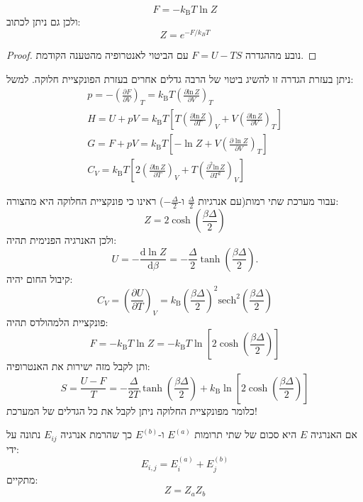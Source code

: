 \documentclass{tstextbook}
\begin{document}
\begin{proposition}
$$F=-k_{\mathrm{B}}T\ln Z$$
ולכן גם ניתן לכתוב:
$$Z=e^{ -F/k_{B}T }$$

\end{proposition}
\begin{proof}
נובע מההגדרה \(F=  U-  T  S\) עם הביטוי לאנטרופיה מהטענה הקודמת.

\end{proof}
\begin{corollary}
ניתן בעזרת הגדרה זו להשיג ביטוי של הרבה גדלים אחרים בעזרת הפונקציית חלוקה. למשל:
$$\begin{gather}p=-\left({\frac{\partial F}{\partial V}}\right)_{T}=k_{\mathrm{B}}T\left({\frac{\partial\mathrm{ln}\,Z}{\partial V}}\right)_{T}  \\H=U+p V=k_{\mathrm{{B}}}T\left[T\left({\frac{\partial\mathrm{ln}\,Z}{\partial T}}\right)_{V}+V\left({\frac{\partial\mathrm{ln}\,Z}{\partial V}}\right)_{T}\right] \\G=F+p V=k_{\mathrm{{B}}}T\left[-\ln Z+V\left({\frac{\partial\ln Z}{\partial V}}\right)_{T}\right] \\C_{V}=k_{\mathrm{{B}}}T\left[2\left(\frac{\partial\mathrm{ln}\,Z}{\partial T}\right)_{V}+T\left(\frac{\partial^{2}\mathrm{ln}\,Z}{\partial T^{2}}\right)_{V}\right]
\end{gather}$$

\end{corollary}
\begin{example}
עבור מערכת שתי רמות(עם אנרגיות \(\frac{\Delta}{2}\) ו-\(-\frac{\Delta}{2}\)) ראינו כי פונקציית החלוקה היא מהצורה:
$$Z=2\cosh\left(\frac{\beta\Delta}{2}\right)$$
ולכן האנרגיה הפנימית תהיה:
$$U=-\frac{\mathrm{d}\ln Z}{\mathrm{d}\beta}=-\frac{\Delta}{2}\operatorname{tanh}\left(\frac{\beta\Delta}{2}\right).$$
קיבול החום יהיה:
$$C_{V}=\left({\frac{\partial U}{\partial T}}\right)_{V}=k_{\mathrm{B}}\left({\frac{\beta\Delta}{2}}\right)^{2}\mathrm{sech}^{2}\left({\frac{\beta\Delta}{2}}\right)$$
פונקציית הלמהולדס תהיה:
$$F=-k_{\mathrm{B}}T\ln Z=-k_{\mathrm{B}}T\ln\left[2\cosh\left({\frac{\beta\Delta}{2}}\right)\right]$$
ותן לקבל מזה ישירות את האנטרופיה:
$$S=\frac{U-F}{T}=-\frac{\Delta}{2T}\operatorname{tanh}\left(\frac{\beta\Delta}{2}\right)+k_{\mathrm{B}}\ln\left[2\cosh\left(\frac{\beta\Delta}{2}\right)\right]$$
כלומר מפונקציית החלוקה ניתן לקבל את כל הגדלים של המערכת!

\end{example}
\begin{proposition}
אם האנרגיה \(E\) היא סכום של שתי תרומות \(E^{(a)}\) ו-\(E^{(b)}\) כך שהרמת אנרגיה \(E_{ij}\) נתונה על ידי:
$$E_{i,j}=E_{i}^{(a)}+E_{j}^{(b)}$$
מתקיים:
$$Z=Z_{a}Z_{b}$$

\end{proposition}
\end{document}
